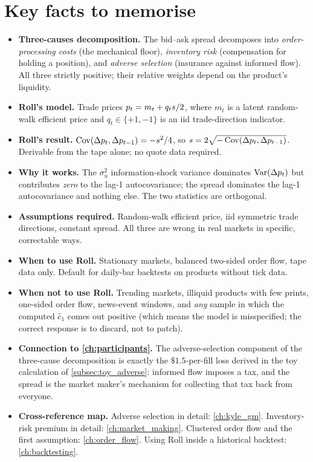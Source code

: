 \section{Key facts to memorise}
\label{sec:ch4_keyfacts}

\begin{itemize}
  \item \textbf{Three-causes decomposition.} The bid--ask spread
  decomposes into \emph{order-processing costs} (the mechanical
  floor), \emph{inventory risk} (compensation for holding a
  position), and \emph{adverse selection} (insurance against
  informed flow). All three strictly positive; their relative
  weights depend on the product's liquidity.
  \item \textbf{Roll's model.} Trade prices $p_t = m_t + q_t
  s/2$, where $m_t$ is a latent random-walk efficient price
  and $q_t \in \{+1,-1\}$ is an iid trade-direction indicator.
  \item \textbf{Roll's result.} $\operatorname{Cov}(\Delta p_t, \Delta p_{t-1}) =
  -s^2/4$, so
  $s = 2\sqrt{-\operatorname{Cov}(\Delta p_t, \Delta p_{t-1})}$.
  Derivable from the tape alone; no quote data required.
  \item \textbf{Why it works.} The $\sigma_u^2$ information-shock
  variance dominates $\operatorname{Var}(\Delta p_t)$ but contributes \emph{zero}
  to the lag-1 autocovariance; the spread dominates the lag-1
  autocovariance and nothing else. The two statistics are
  orthogonal.
  \item \textbf{Assumptions required.} Random-walk efficient price,
  iid symmetric trade directions, constant spread. All three are
  wrong in real markets in specific, correctable ways.
  \item \textbf{When to use Roll.} Stationary markets, balanced
  two-sided order flow, tape data only. Default for daily-bar
  backtests on products without tick data.
  \item \textbf{When not to use Roll.} Trending markets, illiquid
  products with few prints, one-sided order flow, news-event
  windows, and \emph{any} sample in which the computed $\hat c_1$
  comes out positive (which means the model is misspecified; the
  correct response is to discard, not to patch).
  \item \textbf{Connection to \cref{ch:participants}.} The
  adverse-selection component of the three-cause decomposition is
  exactly the $\$1.5$-per-fill loss derived in the toy calculation
  of \cref{subsec:toy_adverse}: informed flow imposes a tax, and
  the spread is the market maker's mechanism for collecting that
  tax back from everyone.
  \item \textbf{Cross-reference map.} Adverse selection in detail:
  \cref{ch:kyle_gm}. Inventory-risk premium in detail:
  \cref{ch:market_making}. Clustered order flow and the first
  assumption: \cref{ch:order_flow}. Using Roll inside a
  historical backtest: \cref{ch:backtesting}.
\end{itemize}
